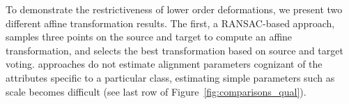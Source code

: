 \documentclass[acmtog,timestamp]{acmart}%
\begin{document}
To demonstrate the restrictiveness of lower order deformations, we present two different affine transformation results. The first, a RANSAC-based approach, samples three points on the source and target to compute an affine transformation, and selects the best transformation based on source and target voting.  approaches do not estimate alignment parameters cognizant of the attributes specific to a particular class, estimating simple parameters such as scale becomes difficult (see last row of Figure~\ref{fig:comparisons_qual}).
\end{document}
